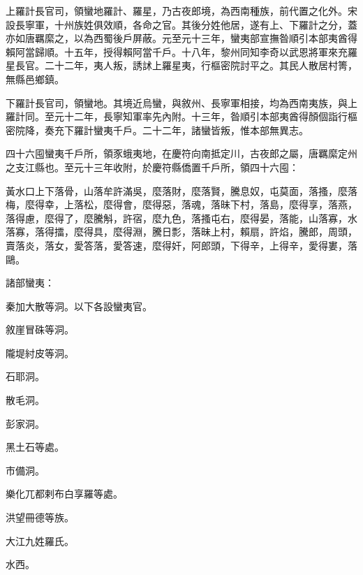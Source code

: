 \begin{pinyinscope}
 上羅計長官司，領蠻地羅計、羅星，乃古夜郎境，為西南種族，前代置之化外。宋設長寧軍，十州族姓俱效順，各命之官。其後分姓他居，遂有上、下羅計之分，蓋亦如唐羈縻之，以為西蜀後戶屏蔽。元至元十三年，蠻夷部宣撫昝順引本部夷酋得賴阿當歸順。十五年，授得賴阿當千戶。十八年，黎州同知李奇以武恩將軍來充羅星長官。二十二年，夷人叛，誘訹上羅星夷，行樞密院討平之。其民人散居村箐，無縣邑鄉鎮。



 下羅計長官司，領蠻地。其境近烏蠻，與敘州、長寧軍相接，均為西南夷族，與上羅計同。至元十二年，長寧知軍率先內附。十三年，昝順引本部夷酋得顏個詣行樞密院降，奏充下羅計蠻夷千戶。二十二年，諸蠻皆叛，惟本部無異志。



 四十六囤蠻夷千戶所，領豕蛾夷地，在慶符向南抵定川，古夜郎之屬，唐羈縻定州之支江縣也。至元十三年收附，於慶符縣僑置千戶所，領四十六囤：



 黃水口上下落骨，山落牟許滿吳，麼落財，麼落賢，騰息奴，屯莫面，落搔，麼落梅，麼得幸，上落松，麼得會，麼得惡，落魂，落昧下村，落島，麼得享，落燕，落得慮，麼得了，麼騰斛，許宿，麼九色，落搔屯右，麼得晏，落能，山落寡，水落寡，落得擂，麼得具，麼得淵，騰日彯，落昧上村，賴扇，許焰，騰郎，周頭，賣落炎，落女，愛答落，愛答速，麼得奸，阿郎頭，下得辛，上得辛，愛得婁，落鷗。



 諸部蠻夷：



 秦加大散等洞。以下各設蠻夷官。



 敘崖冒硃等洞。



 隴堤紂皮等洞。



 石耶洞。



 散毛洞。



 彭家洞。



 黑土石等處。



 市備洞。



 樂化兀都剌布白享羅等處。



 洪望冊德等族。



 大江九姓羅氏。



 水西。




\end{pinyinscope}
